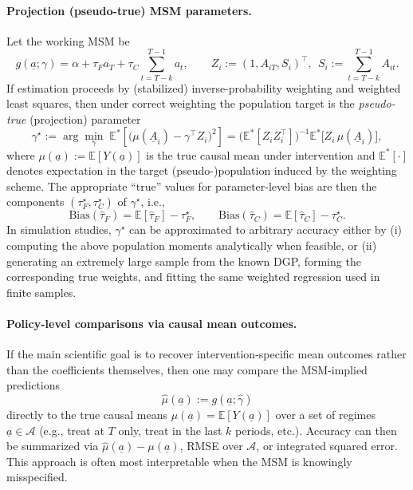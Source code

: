 \paragraph{Projection (pseudo-true) MSM parameters.}
Let the working MSM be
\[
g(\underline a;\gamma)
=
\alpha + \tau_F a_T + \tau_C \sum_{t=T-k}^{T-1} a_t,
\qquad
Z_i := (1, A_{iT}, S_i)^\top,\ \ S_i := \sum_{t=T-k}^{T-1} A_{it}.
\]
If estimation proceeds by (stabilized) inverse-probability weighting and weighted least squares, then under correct weighting the population target is the \emph{pseudo-true} (projection) parameter
\[
\gamma^\star
:=
\arg\min_{\gamma}\;
\mathbb E^\ast\!\left[\bigl(\mu(\underline A_i)-\gamma^\top Z_i\bigr)^2\right]
=
\bigl(\mathbb E^\ast[Z_i Z_i^\top]\bigr)^{-1}\mathbb E^\ast\!\bigl[Z_i\,\mu(\underline A_i)\bigr],
\]
where $\mu(\underline a):=\mathbb E\!\left[Y(\underline a)\right]$ is the true causal mean under intervention and $\mathbb E^\ast[\cdot]$ denotes expectation in the target (pseudo-)population induced by the weighting scheme. The appropriate ``true'' values for parameter-level bias are then the components $(\tau_F^\star,\tau_C^\star)$ of $\gamma^\star$, i.e.,
\[
\text{Bias}(\hat\tau_F)=\mathbb E[\hat\tau_F]-\tau_F^\star,
\qquad
\text{Bias}(\hat\tau_C)=\mathbb E[\hat\tau_C]-\tau_C^\star.
\]
In simulation studies, $\gamma^\star$ can be approximated to arbitrary accuracy either by (i) computing the above population moments analytically when feasible, or (ii) generating an extremely large sample from the known DGP, forming the corresponding true weights, and fitting the same weighted regression used in finite samples.

\paragraph{Policy-level comparisons via causal mean outcomes.}
If the main scientific goal is to recover intervention-specific mean outcomes rather than the coefficients themselves, then one may compare the MSM-implied predictions
\[
\hat\mu(\underline a):=g(\underline a;\hat\gamma)
\]
directly to the true causal means $\mu(\underline a)=\mathbb E[Y(\underline a)]$ over a set of regimes $\underline a\in\mathcal A$ (e.g., treat at $T$ only, treat in the last $k$ periods, etc.). Accuracy can then be summarized via $\hat\mu(\underline a)-\mu(\underline a)$, RMSE over $\mathcal A$, or integrated squared error. This approach is often most interpretable when the MSM is knowingly misspecified.

